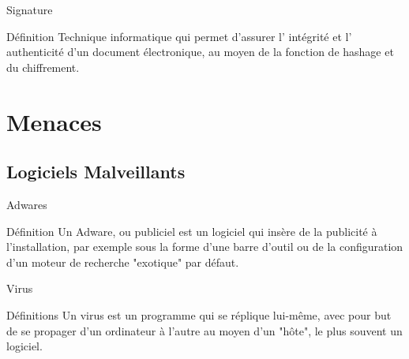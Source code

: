 \documentclass[12pt]{beamer}
\begin{document}
		\begin{frame}{Signature}
			\begin{exampleblock}{Définition}
				Technique informatique qui permet d'assurer l' \alert{intégrité} et l' \alert{authenticité} d'un document électronique, au moyen de la fonction de hashage et du chiffrement.
			\end{exampleblock}
		\end{frame}
		
% 		


\section{Menaces}
	
	\subsection{Logiciels Malveillants}
	
		\begin{frame}{Adwares}
			\begin{exampleblock}{Définition}
						Un \alert{Adware}, ou \alert{publiciel} est un logiciel qui insère de la publicité à l'installation, par exemple sous la forme d'une barre d'outil ou de la configuration d'un moteur de recherche "exotique" par défaut.
				\end{exampleblock}		
		\end{frame}
		
		\begin{frame}{Virus}
			\begin{exampleblock}{Définitions}
						Un \alert{virus} est un programme qui se réplique lui-même, avec pour but de se propager d'un ordinateur à l'autre au moyen d'un "hôte", le plus souvent un logiciel.
				\end{exampleblock}		
		\end{frame}
		
\end{document}
